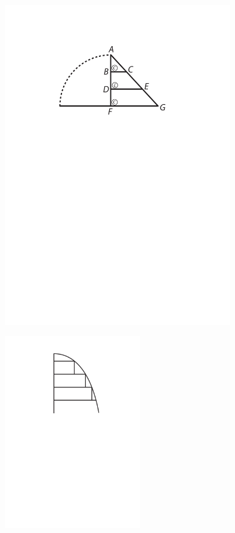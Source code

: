 \pend
\pstart
\noindent
\begin{minipage}[t]{0.5\textwidth}
\hspace*{15mm}
\includegraphics[width=0.75\textwidth]{images/lh0351009_004v-d2.pdf}
\end{minipage}
\hspace*{25mm}
\begin{minipage}[t]{0.5\textwidth}
\includegraphics[width=0.45\textwidth]{images/lh0351009_004v-d2a.pdf}
\end{minipage}\\
